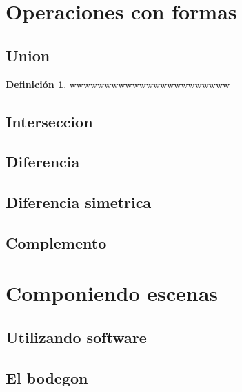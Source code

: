 \documentclass[16pt,]{krantz}
\theoremstyle{definition}
\newtheorem{definition}{Definición}[chapter]
\theoremstyle{definition}
\theoremstyle{definition}
\theoremstyle{definition}
\theoremstyle{remark}
\begin{document}
\hypertarget{operaciones-con-formas}{%
\section{Operaciones con formas}\label{operaciones-con-formas}}

\hypertarget{union}{%
\subsection{Union}\label{union}}

\begin{definition}
\protect\hypertarget{def:unnamed-chunk-2}{}{\label{def:unnamed-chunk-2} }wwwwwwwwwwwwwwwwwwwwwww
\end{definition}

\hypertarget{interseccion}{%
\subsection{Interseccion}\label{interseccion}}

\hypertarget{diferencia}{%
\subsection{Diferencia}\label{diferencia}}

\hypertarget{diferencia-simetrica}{%
\subsection{Diferencia simetrica}\label{diferencia-simetrica}}

\hypertarget{complemento}{%
\subsection{Complemento}\label{complemento}}

\hypertarget{componiendo-escenas}{%
\section{Componiendo escenas}\label{componiendo-escenas}}

\hypertarget{utilizando-software}{%
\subsection{Utilizando software}\label{utilizando-software}}

\hypertarget{el-bodegon}{%
\subsection{El bodegon}\label{el-bodegon}}
\end{document}
